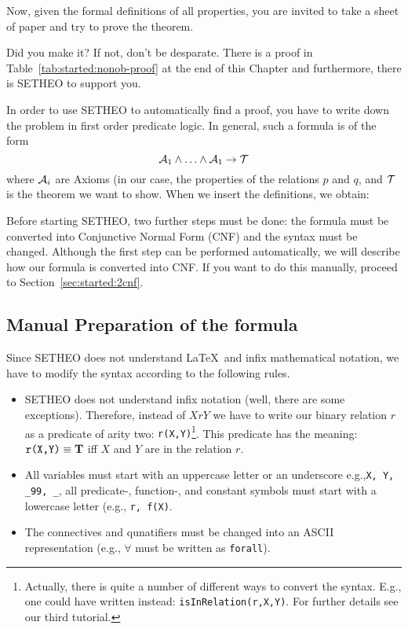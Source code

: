 Now, given the formal definitions of all properties, you are invited
to take a sheet of paper and try to prove the theorem.

Did you make it?
If not, don't be desparate. There is a proof in Table~\ref{tab:started:nonob-proof} at the end of this Chapter and furthermore, there is SETHEO to
support you.

In order to use SETHEO to automatically find a proof, you have to write
down the problem in first order predicate logic.
In general, such a formula is of the form
\[ 
{\cal A}_1 \wedge \ldots  \wedge {\cal A}_1 \rightarrow {\cal T}
\]
where ${\cal A}_i$ are Axioms (in our case, the properties of the relations
$p$ and $q$, and ${\cal T}$ is the theorem we want to show.
When we insert the definitions, we obtain:

\vspace*{4cm}

Before starting SETHEO, two further steps must be done:
the formula must be converted into Conjunctive Normal Form (CNF)
and the syntax must be changed.
Although the first step can be performed automatically, we will describe
how our formula is converted into CNF.
If you want to do this manually, proceed to Section~\ref{sec:started:2cnf}.

\subsection{Manual Preparation of the formula}
Since SETHEO does not understand \LaTeX\ and infix mathematical
notation, we have to modify the syntax according to the following
rules.
\begin{itemize}
\item
SETHEO does not understand infix notation (well, there are some exceptions).
Therefore, instead of $XrY$ we have to write our binary relation $r$
as a predicate of arity two: {\tt r(X,Y)}\footnote{
	Actually, there is quite a number of different ways to
	convert the syntax. E.g., one could have written instead:
	{\tt isInRelation(r,X,Y)}. For further details see our third
	tutorial.}.
This predicate has the meaning: $\mbox{{\tt r(X,Y)}} \equiv {\rm\bf T}$
iff $X$ and $Y$ are in the relation $r$.

\item
All variables must start with an uppercase letter or an underscore
e.g.,{\tt X, Y, \_99, \_}, all
predicate-, function-, and constant symbols must start with a lowercase
letter (e.g., {\tt r, f(X)}.
\item
The connectives and qunatifiers must be changed into an ASCII representation
(e.g., $\forall$ must be written as {\tt forall}).
\end{itemize}

